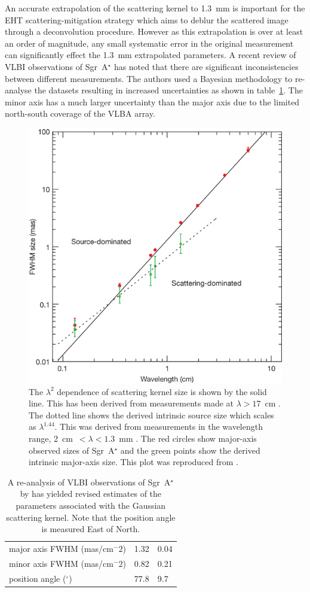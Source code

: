 An accurate extrapolation of the scattering kernel to 1.3~mm is important for the EHT scattering-mitigation strategy \cite{Fish_2014} which aims to deblur the scattered image through a deconvolution procedure. However as this extrapolation is over at least an order of magnitude, any small systematic error in the original measurement can significantly effect the 1.3~mm extrapolated parameters. A recent review of VLBI observations of Sgr~A$^\star$ \cite{Psaltis_2015} has noted that there are significant inconsistencies between different measurements. The authors used a Bayesian methodology to re-analyse the datasets resulting in increased uncertainties as shown in table~\ref{tab:ism_gauss}. The minor axis has a much larger uncertainty than the major axis due to the limited north-south coverage of the VLBA array. 
\begin{figure}
\includegraphics[width=0.6\columnwidth]{Images/scattering_law}
\caption{The $\lambda^2$ dependence of scattering kernel size is shown by the solid line. This has been derived from measurements made at $\lambda > 17$~cm \protect\cite{Bower_2006}. The dotted line shows the derived intrinsic source size which scales as $\lambda^{1.44}$. This was derived from measurements in the wavelength range, 2~cm~$< \lambda < 1.3$~mm \citep{Doeleman_2008}. The red circles show major-axis observed sizes of Sgr~A$^\star$  and the green points show the derived intrinsic major-axis size. This plot was reproduced from \protect\citet{Doeleman_2008}.\label{fig:scattering_law}
}
\end{figure}
\begin{table}[]
\centering
\caption{A re-analysis of VLBI observations of Sgr~A$^\star$ by \citet{Psaltis_2015} has yielded revised estimates of the parameters associated with the Gaussian scattering kernel. Note that the position angle is measured East of North. \label{tab:ism_gauss}}
\begin{tabular}{l|ll}
\hline
major axis FWHM (mas/cm$^-2$)& 1.32 & 0.04 \\
minor axis FWHM (mas/cm$^-2$)& 0.82 & 0.21 \\
position angle ($^\circ$)& 77.8 & 9.7\\  
\hline
\end{tabular}
\end{table}


